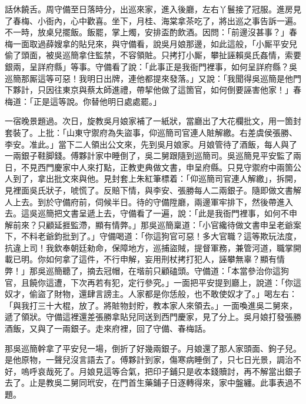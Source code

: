 話休饒舌。周守備至日落時分，出巡來家，進入後廳，左右丫鬟接了冠服。進房見了春梅、小衙內，心中歡喜。坐下，月桂、海棠拿茶吃了，將出巡之事告訴一遍。不一時，放桌兒擺飯。飯罷，掌上燭，安排盃酌飲酒。因問：「前邊沒甚事？」春梅一面取過薛嫂拿的貼兒來，與守備看，說吳月娘那邊，如此這般，「小厮平安兒偷了頭面，被吳巡簡拿住監禁，不容領賍。只拷打小厮，攀扯誣賴吳氏姦情，索要銀兩，呈詳府縣」等事。守備看了說：「此事正是我衙門裡事，如何呈詳府縣？吳巡簡那厮這等可惡！我明日出牌，連他都提來發落。」又說：「我聞得吳巡簡是他門下夥計，只因往東京與蔡太師進禮，帶挈他做了這箇官，如何倒要誣害他家！」春梅道：「正是這等說。你替他明日處處罷。」

一宿晚景題過。次日，旋教吳月娘家補了一紙狀，當廳出了大花欄批文，用一箇封套裝了。上批：「山東守禦府為失盜事，仰巡簡司官連人賍解繳。右差虞侯張勝、李安。准此。」當下二人領出公文來，先到吳月娘家。月娘管待了酒飯，每人與了一兩銀子鞋脚錢。傅夥計家中睡倒了，吳二舅跟隨到巡簡司。吳巡簡見平安監了兩日，不見西門慶家中人來打點，正教吏典做文書，申呈府縣。只見守禦府中兩箇公人到了，拿出批文來與他。見封套上朱紅筆標着：「仰巡簡司官連人解繳」，拆開，見裡面吳氏狀子，唬慌了。反賠下情，{}與李安、張勝每人二兩銀子。隨即做文書解人上去。到於守備府前，伺候半日。待的守備陞廳，兩邊軍牢排下，然後帶進入去。這吳巡簡把文書呈遞上去，守備看了一遍，說：「此是我衙門裡事，如何不申解前來？只顧延捱監滯，顯有情弊。」那吳巡簡稟道：「小官纔待做文書申呈老爺案下，不料老爺鈞批到了。」守備喝道：「你這狗官可惡！多大官職？這等欺玩法度，抗違上司！我欽奉朝廷勑命，保障地方，巡捕盜賊，提督軍務，兼管河道，職掌開載已明。你如何拿了這件，不行申解，妄用刑杖拷打犯人，誣攀無辜？顯有情弊！」那吳巡簡聽了，摘去冠帽，在堦前只顧磕頭。守備道：「本當參治你這狗官，且饒你這遭，下次再若有犯，定行參究。」{}一面把平安提到廳上，說道：「你這奴才，偷盜了財物，還肆言謗主。人家都是你恁般，也不敢使奴才了。」喝左右：「與我打三十大棍，放了。將賍物封貯，教本家人來領去。」一面喚進吳二舅來，遞了領狀。守備這裡還差張勝拿貼兒同送到西門慶家，見了分上。吳月娘打發張勝酒飯，又與了一兩銀子。走來府裡，回了守備、春梅話。

那吳巡簡幹拿了平安兒一場，倒折了好幾兩銀子。月娘還了那人家頭面、鉤子兒。是他原物，一聲兒沒言語去了。傅夥計到家，傷寒病睡倒了，只七日光景，調治不好，嗚呼哀哉死了。{}月娘見這等合氣，把印子鋪只是收本錢贖討，再不解當出銀子去了。止是教吳二舅同玳安，在門首生藥鋪子日逐轉得來，家中盤纏。此事表過不題。

